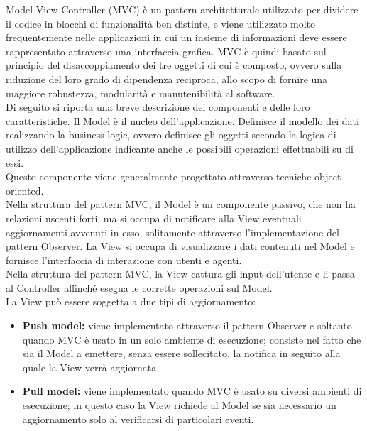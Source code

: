 \label{app:designpattern}
	 \label{app:MVC}
		Model-View-Controller (MVC) è un pattern architetturale utilizzato per dividere il codice in blocchi di funzionalità ben distinte, e viene utilizzato molto frequentemente nelle applicazioni in cui un insieme di informazioni deve essere rappresentato attraverso una interfaccia grafica.
			MVC è quindi basato sul principio del disaccoppiamento dei tre oggetti di cui è composto, ovvero sulla riduzione del loro grado di dipendenza reciproca, allo scopo di fornire una maggiore robustezza, modularità e manutenibilità al software.\\
			Di seguito si riporta una breve descrizione dei componenti e delle loro caratteristiche. 
				Il Model è il nucleo dell'applicazione. Definisce il modello dei dati realizzando la business logic, ovvero definisce gli oggetti secondo la logica di utilizzo dell'applicazione indicante anche le possibili operazioni effettuabili su di essi.\\
				Questo componente viene generalmente progettato attraverso tecniche object oriented.\\
				Nella struttura del pattern MVC, il Model è un componente passivo, che non ha relazioni uscenti forti, ma si occupa di notificare alla View eventuali aggiornamenti avvenuti in esso, solitamente attraverso l'implementazione del pattern Observer.
				La View si occupa di visualizzare i dati contenuti nel Model e fornisce l'interfaccia di interazione con utenti e agenti.\\
				Nella struttura del pattern MVC, la View cattura gli input dell'utente e li passa al Controller affinché esegua le corrette operazioni sul Model. \\
				La View può essere soggetta a due tipi di aggiornamento:
				\begin{itemize}
					\item \textbf{Push model:} viene implementato attraverso il pattern Observer e soltanto quando MVC è usato in un solo ambiente di esecuzione; consiste nel fatto che sia il Model a emettere, senza essere sollecitato, la notifica in seguito alla quale la View verrà aggiornata.
					\item \textbf{Pull model:} viene implementato quando MVC è usato su diversi ambienti di esecuzione; in questo caso la View richiede al Model se sia necessario un aggiornamento solo al verificarsi di particolari eventi.
				\end{itemize}
